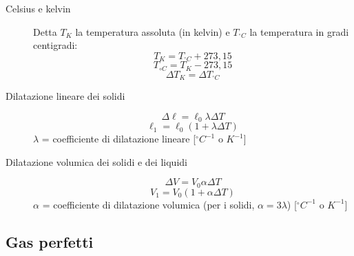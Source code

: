 \documentclass[a4paper,11pt,italian]{article}
\begin{document}
\begin{description}
  \item[Celsius e kelvin]
  Detta $ T_K $ la temperatura assoluta (in kelvin) e $ T_{^{\circ}C} $ la temperatura in gradi centigradi:
  \[ T_K = T_{^{\circ}C} + 273,15 \]
  \[ T_{{\circ}C} = T_{K} - 273,15 \]
  \[ \Delta T_K = \Delta T_{^{\circ}C} \]
  
  \item[Dilatazione lineare dei solidi] 
  \[ \Delta \ell = \ell_0 \lambda \Delta T \] 
  \[ \ell_1 = \ell_0 (1 + \lambda \Delta T) \]
  $ \lambda $ = coefficiente di dilatazione lineare [$ ^{\circ}C^{-1} $ o $ K^{-1} $]
  
  \item[Dilatazione volumica dei solidi e dei liquidi] 
  \[ \Delta V = V_0 \alpha \Delta T \] 
  \[ V_1 = V_0 (1 + \alpha \Delta T) \]
  $ \alpha $ = coefficiente di dilatazione volumica (per i solidi, $ \alpha = 3 \lambda $) [$ ^{\circ}C^{-1} $ o $ K^{-1} $]
\end{description}

\subsection{Gas perfetti}
\end{document}
